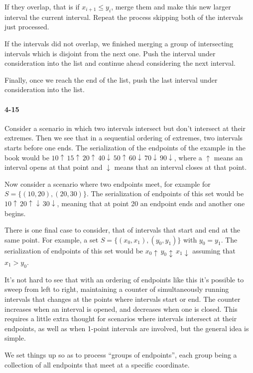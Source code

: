 \documentclass{report}
\begin{document}
If they overlap, that is if $x_{i+1} \le y_i$, merge them and make this new larger interval the current interval. Repeat the process skipping both of the intervals just processed.

If the intervals did not overlap, we finished merging a group of intersecting intervals which is disjoint from the next one. Push the interval under consideration into the list and continue ahead considering the next interval.

Finally, once we reach the end of the list, push the last interval under consideration into the list.

\paragraph{4-15} Consider a scenario in which two intervals intersect but don't intersect at their extremes. Then we see that in a sequential ordering of extremes, two intervals starts before one ends. The serialization of the endpoints of the example in the book would be $10\!\uparrow\,15\!\uparrow\,20\!\uparrow\,40\!\downarrow\,50\!\uparrow\,60\!\downarrow\,70\!\downarrow\,90\!\downarrow$, where a $\uparrow$ means an interval opens at that point and $\downarrow$ means that an interval closes at that point.

Now consider a scenario where two endpoints meet, for example for $S=\{(10,20),(20,30)\}$. The serialization of endpoints of this set would be $10\!\uparrow\,20\!\uparrow\downarrow\,30\!\downarrow$, meaning that at point 20 an endpoint ends and another one begins.

There is one final case to consider, that of intervals that start and end at the same point. For example, a set $S=\{(x_0, x_1), (y_0, y_1)\}$ with $y_0=y_1$. The serialization of endpoints of this set would be $x_0\!\uparrow\,y_0\!\updownarrow\,x_1\!\downarrow$ assuming that $x_1 > y_0$.

It's not hard to see that with an ordering of endpoints like this it's possible to sweep from left to right, maintaining a counter of simultaneously running intervals that changes at the points where intervals start or end. The counter increases when an interval is opened, and decreases when one is closed. This requires a little extra thought for scenarios where intervals intersect at their endpoints, as well as when 1-point intervals are involved, but the general idea is simple.

We set things up so as to process ``groups of endpoints'', each group being a collection of all endpoints that meet at a specific coordinate.
\end{document}
